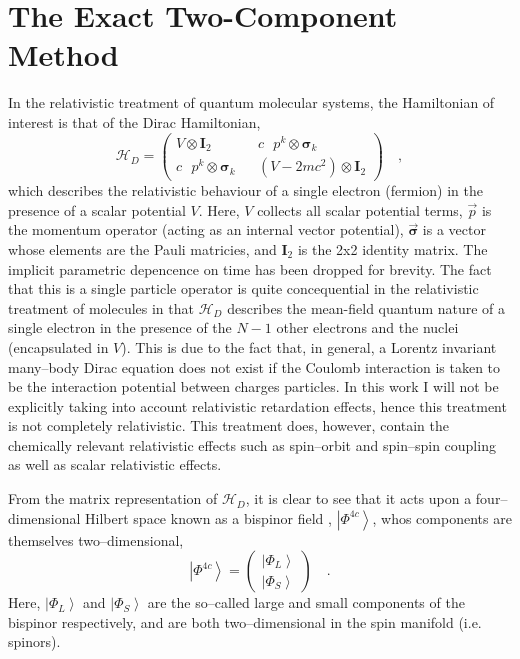 \documentclass[12pt]{article}
\newcommand{\ket}[1]{\left\vert #1 \right\rangle}         %
\newcommand*\vc[1]{\boldsymbol{#1}}
\begin{document}

\section{The Exact Two-Component Method}
\label{sec:X2C}
In the relativistic treatment of quantum molecular systems, the Hamiltonian
of interest is that of the Dirac Hamiltonian,
\begin{equation}
\mathscr{H}_D = 
\begin{pmatrix}
  V \otimes \vc{I}_2 && c \text { } p^k \otimes \vc{\sigma}_k \\
  c \text { } p^k \otimes \vc{\sigma}_k && (V - 2mc^2) \otimes \vc{I}_2
\end{pmatrix} \quad ,
\label{eq:DiracHam}
\end{equation}
which describes the relativistic behaviour of a single electron (fermion) in the
presence of a scalar potential $V$. Here, $V$ collects all scalar potential
terms, $\vec{p}$ is the momentum operator (acting as an internal vector
potential), $\vec{\vc{\sigma}}$ is a vector whose elements are the Pauli
matricies, and $\vc{I}_2$ is the 2x2 identity matrix. The implicit parametric
depencence on time has been dropped for brevity. The fact that this is a single
particle operator is quite concequential in the relativistic treatment of
molecules in that $\mathscr{H}_D$ describes the mean-field quantum nature of a
single electron in the presence of the $N-1$ other electrons and the nuclei
(encapsulated in $V$). This is due to the fact that, in general, a Lorentz
invariant many--body Dirac equation does not exist if the Coulomb interaction is
taken to be the interaction potential between charges particles. In this work I
will not be explicitly taking into account relativistic retardation effects,
hence this treatment is not completely relativistic. This treatment does,
however, contain the chemically relevant relativistic effects such as
spin--orbit and spin--spin coupling as well as scalar relativistic effects.

From the matrix representation of $\mathscr{H}_D$, it is clear to see that it
acts upon a four--dimensional Hilbert space known as a bispinor field ,
$\ket{\Phi^{4c}}$, whos components are themselves two--dimensional,
\begin{equation}
\ket{\Phi^{4c}} = \begin{pmatrix}
 \ket{\Phi_L} \\ \ket{\Phi_S}
\end{pmatrix} \quad.
\end{equation}
Here, $\ket{\Phi_L}$ and $\ket{\Phi_S}$ are the so--called large and small
components of the bispinor respectively, and are both two--dimensional in the
spin manifold (i.e. spinors).
\end{document}
